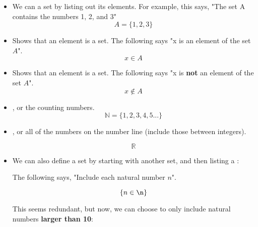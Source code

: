     
    \begin{itemize}
        \item We can  a set by listing out its elements. For example, this says, "The set A contains the numbers 1, 2, and 3"
            \begin{equation}
                A = \{1, 2, 3\}
            \end{equation}
            
            
            
        \item Shows that an element is  a set. The following says "x is an element of the set $A$".
            \begin{equation}
                x \in A
            \end{equation}
            
        \item Shows that an element is  a set. The following says "x is \textbf{not} an element of the set $A$".
            \begin{equation}
                x \notin A
            \end{equation}
            
        \item {}, or the counting numbers. 
            \begin{equation}
                \mathbb{N} = \{ 1, 2, 3, 4, 5... \}
            \end{equation}
            
        \item {}, or all of the numbers on the number line (include those between integers).
        
            \begin{equation}
                \mathbb{R}
            \end{equation}
            
        \item We can also define a set by starting with another set, and then listing a :
        
            The following says, "Include each natural number $n$".
            
            \begin{equation}
                \{ n \in \n \}
            \end{equation}
            
            This seems redundant, but now, we can choose to only include natural numbers \textbf{larger than 10}:
            

\end{itemize}
